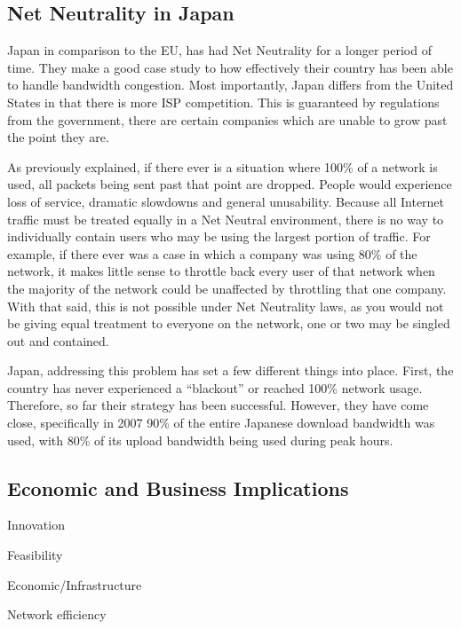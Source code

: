 \documentclass{sigcomm-alternate}
\begin{document}
\subsection{Net Neutrality in Japan}

Japan in comparison to the EU, has had Net Neutrality for a longer period of time.  They make a good case study to how effectively their country has been able to handle bandwidth congestion.  Most importantly, Japan differs from the United States in that there is more ISP competition.  This is guaranteed by regulations from the government, there are certain companies which are unable to grow past the point they are.

As previously explained, if there ever is a situation where 100\% of a network is used, all packets being sent past that point are dropped.  People would experience loss of service, dramatic slowdowns and general unusability.  Because all Internet traffic must be treated equally in a Net Neutral environment, there is no way to individually contain users who may be using the largest portion of traffic.  For example, if there ever was a case in which a company was using 80\% of the network, it makes little sense to throttle back every user of that network when the majority of the network could be unaffected by throttling that one company.  With that said, this is not possible under Net Neutrality laws, as you would not be giving equal treatment to everyone on the network, one or two may be singled out and contained.

Japan, addressing this problem has set a few different things into place.  First, the country has never experienced a “blackout” or reached 100\% network usage.  Therefore, so far their strategy has been successful.  However, they have come close, specifically in 2007 90\% of the entire Japanese download bandwidth was used, with 80\% of its upload bandwidth being used during peak hours.  

\subsection{Economic and Business Implications}

Innovation

Feasibility

Economic/Infrastructure

Network efficiency




\end{document}
